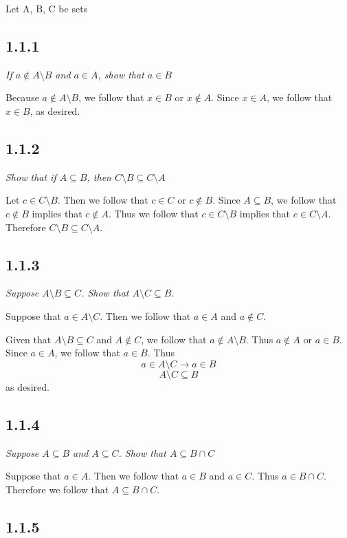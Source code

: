 \documentclass[11pt,oneside,titlepage]{book}
\begin{document}
Let A, B, C be sets

\subsection*{1.1.1}

\textit{If $a \notin A \setminus B$ and $a \in A$, show that $a \in B$}

Because $a \notin A \setminus B$, we follow that $x \in B$ or $x \notin A$. Since $x \in A$, we
follow that $x \in B$, as desired.

\subsection*{1.1.2}

\textit{Show that if $A \subseteq B$, then $C \setminus B \subseteq C \setminus A$}

Let $c \in C \setminus B$. Then we follow that $c \in C$ or $c \notin B$. Since $A \subseteq B$,
we follow that $c \notin B$ implies that $c \notin A$. Thus we follow that
$c \in C \setminus B$ implies that $c \in C \setminus A$. Therefore $C \setminus B \subseteq
C \setminus A$.

\subsection*{1.1.3}

\textit{Suppose $A \setminus B \subseteq C$. Show that $A \setminus C \subseteq B$.}

Suppose that $a \in A \setminus C$. Then we follow that $a \in A$ and $a \notin C$.

Given that $A \setminus B \subseteq C$ and $A \notin C$, we follow that $a \notin A \setminus B$.
Thus $a \notin A$ or $a \in B$. Since $a \in A$, we follow that $a \in B$. Thus
$$a \in A \setminus C \to a \in B$$
$$A \setminus C \subseteq  B$$
as desired.

\subsection*{1.1.4}

\textit{Suppose $A \subseteq B$ and $A \subseteq C$. Show that $A \subseteq B \cap C$}

Suppose that $a \in A$. Then we follow that $a \in B$ and $a \in C$. Thus $a \in B \cap C$.
Therefore we follow that $A \subseteq B \cap C$.

\subsection*{1.1.5}
\end{document}
